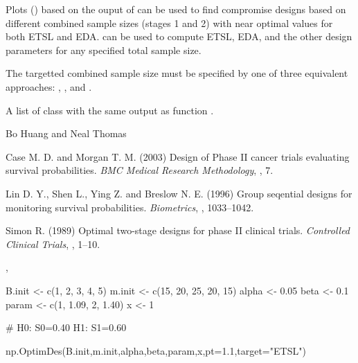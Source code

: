 \begin{Details}\relax
Plots () based on the ouput of
 can be used to find compromise designs based on
different combined sample sizes (stages 1 and 2) with
near optimal values for both ETSL and EDA.   can be
used to compute ETSL, EDA, and the other design parameters for any
specified total sample size.

The targetted combined sample size must be specified by one of
three equivalent approaches: , , and .
\end{Details}
\begin{Value}
A list of class  with the same output as function .
\end{Value}
\begin{Author}\relax
Bo Huang  and Neal Thomas
\end{Author}
\begin{References}\relax
Case M. D. and Morgan T. M. (2003) Design of Phase II cancer trials
evaluating survival probabilities. \emph{BMC Medical Research
Methodology}, , 7.

Lin D. Y., Shen L., Ying Z. and Breslow N. E. (1996) Group seqential
designs for monitoring survival probabilities. \emph{Biometrics},
, 1033--1042.

Simon R. (1989) Optimal two-stage designs for phase II clinical
trials. \emph{Controlled Clinical Trials}, , 1--10.
\end{References}
\begin{SeeAlso}\relax
{}, 
\end{SeeAlso}
\begin{Examples}
\begin{ExampleCode}
B.init <- c(1, 2, 3, 4, 5)
m.init <- c(15, 20, 25, 20, 15)
alpha <- 0.05
beta <- 0.1
param <- c(1, 1.09, 2, 1.40)
x <- 1

# H0: S0=0.40 H1: S1=0.60

np.OptimDes(B.init,m.init,alpha,beta,param,x,pt=1.1,target="ETSL")
\end{ExampleCode}
\end{Examples}

